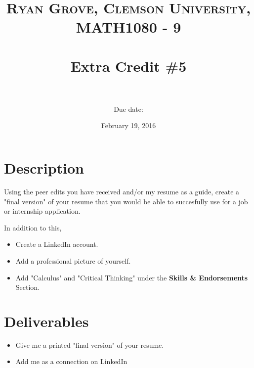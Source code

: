 \documentclass[paper=a4, fontsize=11pt]{scrartcl} %
\title{	
\normalfont \normalsize 
\textsc{Ryan Grove, Clemson University, MATH1080 - 9} \\ [25pt] %
\horrule{0.5pt} \\[0.4cm] %
\huge Extra Credit \#5 \\ %
\horrule{2pt} \\[0.5cm] %
}
\author{Due date:} %
\date{\normalsize February 19, 2016} %
\numberwithin{equation}{section} %
\numberwithin{figure}{section} %
\numberwithin{table}{section} %
\begin{document}
\maketitle %


\section*{\textbf{Description}}

Using the peer edits you have received and/or my resume as a guide, create a "final version" of your resume that you would be able to succesfully use for a job or internship application. 

In addition to this,

\begin{itemize}
\item Create a LinkedIn account.

\item Add a professional picture of yourself.

\item Add "Calculus" and "Critical Thinking" under the \textbf{Skills \& Endorsements} Section.
\end{itemize}


\section*{\textbf{Deliverables}}

\begin{itemize}
\item Give me a printed "final version" of your resume.

\item Add me as a connection on LinkedIn
\end{itemize}

\end{document}

